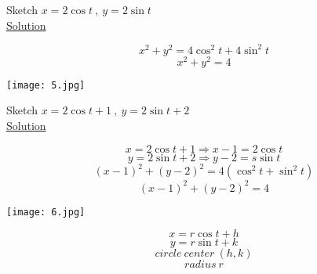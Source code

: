 \begin{example}
Sketch $x=2\cos t~,~y=2\sin t$\\
\underline{\textbf{\large}\color{smalt(darkpowderblue)}Solution} \\
\begin{minipage}{0.5\textwidth}
$$x^2+y^2=4\cos^2 t+4\sin^2 t$$
$$x^2+y^2=4$$
\end{minipage}
\begin{minipage}{0.5\textwidth}
\texttt{[image: 5.jpg]}
\end{minipage}
\end{example}
\noindent{\color{smalt(darkpowderblue)}\rule{\linewidth}{.2mm}}

\begin{example}
Sketch $x=2\cos t+1~,~y=2\sin t+2$\\
\underline{\textbf{\large}\color{smalt(darkpowderblue)}Solution} \\
\begin{minipage}{0.48\textwidth}
$$x=2\cos t+1\Rightarrow x-1=2\cos t$$
$$y=2\sin t+2\Rightarrow y-2=s\sin t$$
$$(x-1)^2+(y-2)^2=4(\cos^2 t+\sin^2 t)$$
$$(x-1)^2+(y-2)^2=4$$
\end{minipage}
\begin{minipage}{0.18\textwidth}
\texttt{[image: 6.jpg]}
\end{minipage}
\begin{minipage}{0.5\textwidth}
$$x=r\cos t+h$$
$$y=r\sin t+k$$
$$circle~center~(h,k)$$
$$radius~r$$
\end{minipage}
\end{example}

